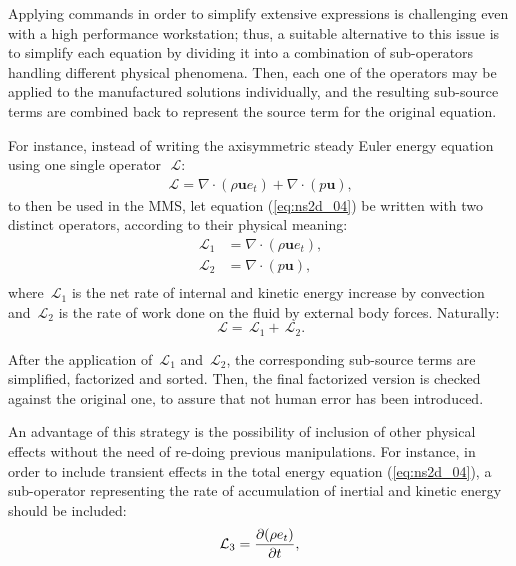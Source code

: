 \documentclass[10pt]{article}
\newcommand{\bv}[1]{\ensuremath{\mbox{\boldmath$ #1 $}}}
\newcommand{\Diff}[2] {\dfrac{\partial( #1)}{\partial #2}}
\newcommand{\Lo}{\,\mathcal{L}}
\begin{document}
Applying commands in order to simplify extensive expressions is challenging even with a high performance workstation; thus, a suitable alternative to this issue is to simplify each equation by dividing it into a combination of sub-operators handling different physical phenomena. Then, each one of the operators may be applied to the manufactured solutions individually, and the resulting sub-source terms are combined back to represent the source term for the original equation.


For instance, instead of writing the axisymmetric  steady Euler energy equation using one single operator~$\Lo$:
\begin{equation}
 \label{eq:ns2d_04}
\begin{split}
\Lo= \nabla \cdot (\rho\mathbf{u}e_t)+ \nabla\cdot(p  \mathbf{u}) ,
\end{split}
\end{equation}
to then be used in the MMS, let equation (\ref{eq:ns2d_04}) be written with two distinct operators, according to their physical meaning:
\begin{equation}
 \begin{split}\label{op01}
  \Lo_1&=\nabla \cdot (\rho\mathbf{u}e_t),\\
  \Lo_2&= \nabla\cdot(p  \mathbf{u}),\\
   \end{split}
\end{equation}
where $\Lo_1$ is the net rate of internal and kinetic energy increase by convection and  $\Lo_2$ is the rate of work done on the fluid by external body forces. Naturally:
$$\Lo=\Lo_1+\Lo_2.$$


 After the application of $\Lo_1$ and $\Lo_2$, the corresponding sub-source terms are simplified, factorized and sorted. Then, the final factorized version is checked against the original one, to assure that not human error has been introduced.

An advantage of this strategy is the possibility of inclusion of other physical effects without the need of re-doing previous manipulations. For instance, in order to include transient effects in the total energy equation (\ref{eq:ns2d_04}), a sub-operator representing the rate of accumulation of inertial and kinetic energy should be included:
\begin{equation}
 \label{op02}
  \Lo_3=\Diff{\rho e_t}{t} ,\\
 \end{equation}
\end{document}
